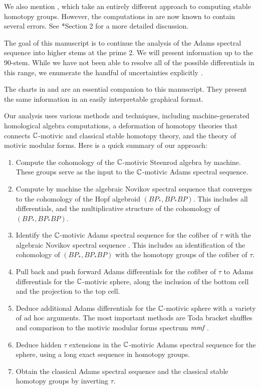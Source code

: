 We also mention \cite{Kochman90}  \cite{KM93},
which take an entirely different approach to computing stable
homotopy groups. 
However, the computations in \cite{Kochman90}  \cite{KM93} are now known to contain several errors. 
See \cite{WangXu17}*{Section 2} for a more detailed discussion.

The goal of this manuscript is to continue the analysis of the Adams
spectral sequence into higher stems at the prime 2.  We will present information
up to the 90-stem.
While we have not
been able to resolve all of the possible differentials in this range,
we enumerate the handful of uncertainties explicitly
.

The charts in \cite{Isaksen14a} and \cite{IWX19}
are an essential companion to this manuscript. 
They present the same information in an easily interpretable 
graphical format.


Our analysis uses various methods and techniques, including 
machine-generated homological algebra computations, 
a deformation of homotopy theories that connects
$\mathbb{C}$-motivic and classical stable homotopy theory,
and the theory of motivic modular forms. Here is a quick summary of our approach:
\begin{enumerate}
\item
\label{item:machine-Adams}
Compute 
the cohomology of the $\mathbb{C}$-motivic Steenrod algebra by machine.  
These groups
serve as the input to the $\mathbb{C}$-motivic Adams spectral sequence.
\item
\label{item:machine-algNov}
Compute by machine
the algebraic Novikov spectral sequence that converges to the
cohomology of the Hopf algebroid $(BP_*, BP_* BP)$.
This includes all
differentials, and the multiplicative structure of the cohomology of
$(BP_*, BP_* BP)$.
\item
Identify
the $\mathbb{C}$-motivic Adams spectral sequence for the cofiber of $\tau$ 
with 
the algebraic Novikov spectral sequence
\cite{GWX18}.  This includes an identification of the
cohomology of $(BP_*, BP_* BP)$ with the
homotopy groups of the cofiber of $\tau$.
\item
Pull back and push forward Adams differentials for the cofiber of $\tau$
to Adams differentials for the $\mathbb{C}$-motivic sphere, along
the inclusion of the bottom cell and the projection to the top cell.
\item
\label{item:ad-hoc}
Deduce additional Adams differentials for the $\mathbb{C}$-motivic sphere with 
a variety of ad hoc arguments.  The most important methods are Toda bracket shuffles and 
comparison to the motivic modular forms spectrum $\textit{mmf}$ \cite{GIKR18}.
\item
Deduce hidden $\tau$
extensions in the $\mathbb{C}$-motivic Adams spectral sequence for the sphere, 
using a long exact sequence in homotopy groups.
\item
Obtain the classical Adams spectral sequence and the 
classical stable homotopy groups by inverting $\tau$.
\end{enumerate}

